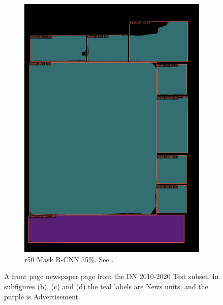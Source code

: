 \documentclass[oneside, english, bibtex]{kththesis}
\begin{document}
\begin{figure}[!htb]
\begin{adjustbox}{center,max size={\textwidth}{0.9\textheight}}
{\begin{subfigure}{0.6\textwidth}
\includegraphics[width=\linewidth]{figures/labels-vanilla-0.75/JIefsDa.jpg}
  \caption{r50 Mask R-CNN 75\%. See . }
  \label{fig:JIefsDa_pred}
\end{subfigure}}
\end{adjustbox}
  \caption{A front page newspaper page from the DN 2010-2020 Test subset. In subfigures (b), (c) and (d) the teal labels are News units, and the purple is Advertisement.}
\label{fig:JIefsDa}
\end{figure}

\clearpage
\end{document}
